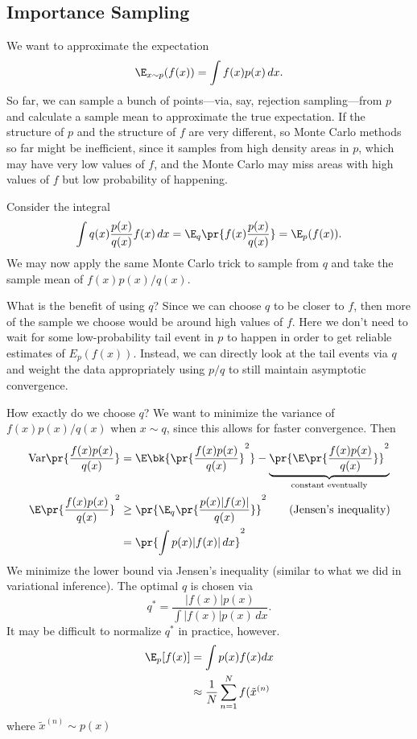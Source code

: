 \documentclass{article}
\begin{document}
\subsection{Importance Sampling}


We want to approximate the expectation \[\E_{x\sim p}(f(x)) = \int f(x) p(x)\,dx.\]
So far, we can sample a bunch of points---via, say, rejection sampling---from $p$ and calculate a sample mean to approximate the true expectation. If the structure of $p$ and the structure of $f$ are very different, so Monte Carlo methods so far might be inefficient, since it samples from high density areas in $p$, which may have very low values of $f$, and the Monte Carlo may miss areas with high values of $f$ but low probability of happening. 

\medskip

Consider the integral \[
\int q(x) \frac{p(x)}{q(x)}f(x)\,dx = \E_q\pr{f(x)\frac{p(x)}{q(x)}} = \E_{p}(f(x)).
\]
We may now apply the same Monte Carlo trick to sample from $q$ and take the sample mean of $f(x) p(x)/q(x)$.

\medskip

What is the benefit of using $q$? Since we can choose $q$ to be closer to $f$, then more of the sample we choose would be around high values of $f$. Here we don't need to wait for some low-probability tail event in $p$ to happen in order to get reliable estimates of $E_p(f(x)).$ Instead, we can directly look at the tail events via $q$ and weight the data appropriately using $p/q$ to still maintain asymptotic convergence.

How exactly do we choose $q$? We want to minimize the variance of $f(x)p(x)/q(x)$ when $x\sim q$, since this allows for faster convergence. Then \begin{align*}
\text{Var}\pr{\frac{f(x)p(x)}{q(x)}} &= \E\bk{\pr{\frac{f(x)p(x)}{q(x)}}^2} - \underbrace{\pr{\E\pr{\frac{f(x)p(x)}{q(x)}}}^2}_{\text{constant eventually}} \\
\E\pr{\frac{f(x)p(x)}{q(x)}}^2 &\ge \pr{\E_q\pr{\frac{p(x)|f(x)|}{q(x)}}}^2 \tag{Jensen's inequality}\\
&= \pr{\int p(x)|f(x)|\,dx}^2
\end{align*}
We minimize the lower bound via Jensen's inequality (similar to what we did in variational inference). The optimal $q$ is chosen via \[
q^* = \frac{|f(x)|p(x)}{
    \int |f(x)|p(x)\,dx
}.
\]
It may be difficult to normalize $q^*$ in practice, however. 
\begin{align*}
    \E_{p}[f(x)] & = \int p(x) f(x) dx \\
    & \approx \frac{1}{N} \sum_{n=1}^{N} f(\tilde{x}^{(n)} 
\end{align*}
where $\tilde{x}^{(n)} \sim p(x)$
\end{document}

